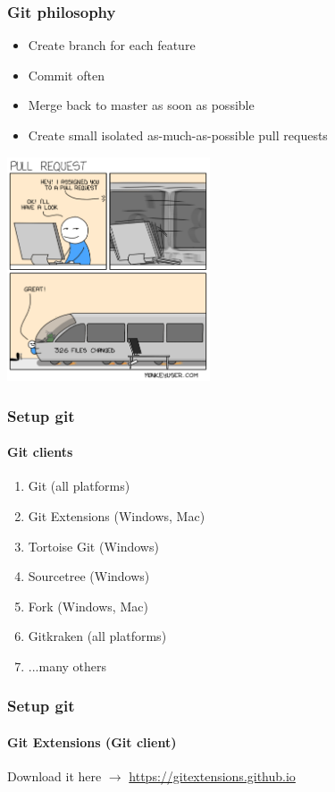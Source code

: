 \documentclass[aspectratio=169]{beamer}
\newcommand{\adjustimg}{%
  \checkoddpage%
  \ifoddpage\hspace*{\dimexpr\evensidemargin-\oddsidemargin}\else\hspace*{-\dimexpr\evensidemargin-\oddsidemargin}\fi%
}
\newcommand{\centerimg}[2][width=\textwidth]{%
  \makebox[\textwidth]{\adjustimg\texttt{[image: \#2]}}%
}
\begin{document}
    \begin{frame}[fragile]
        \frametitle{Git philosophy}
        \begin{multicols}{2}
            \begin{itemize}
                \item Create branch for each feature
                \item Commit often
                \item Merge back to master as soon as possible
                \item Create small isolated as-much-as-possible pull requests
            \end{itemize}
            \includegraphics[width=0.45\textwidth]{pull-request.png}
        \end{multicols}
    \end{frame}
    
    \begin{frame}
        \frametitle{Setup git}
        \framesubtitle{Git clients}
        \begin{enumerate}
            \item Git (all platforms)
            \item Git Extensions (Windows, Mac)
            \item Tortoise Git (Windows)
            \item Sourcetree (Windows)
            \item Fork (Windows, Mac)
            \item Gitkraken (all platforms)
            \item ...many others
        \end{enumerate}
    \end{frame}
    \begin{frame}
        \frametitle{Setup git}
        \framesubtitle{Git Extensions (Git client)}
        \noindent\centerimg[width=0.8\paperwidth]{gitex.png} 
        Download it here $\rightarrow$ \url{https://gitextensions.github.io}
    \end{frame}
\end{document}
